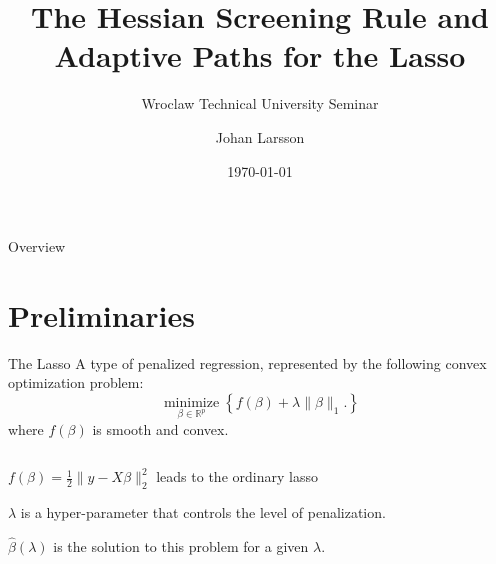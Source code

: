 



\title{The Hessian Screening Rule and Adaptive Paths for the Lasso}
\subtitle{Wroclaw Technical University Seminar}
\author{Johan Larsson}
\date{\today}




\begin{frame}{Overview}
  \tableofcontents[hideallsubsections]
\end{frame}

\section{Preliminaries}

\begin{frame}{The Lasso}
  A type of penalized regression, represented by the following
  convex optimization problem:
  \[
    \operatorname*{minimize}_{\beta \in \mathbb{R}^p}
    \left\{
      f(\beta) + \lambda \lVert \beta \rVert_1.
    \right\}
  \]
  where \(f(\beta)\) is smooth and convex. \medskip

  \begin{columns}[T]
    \begin{column}{0.45\linewidth}
      \(f(\beta) = \frac 1 2 \lVert y - X\beta\rVert_2^2\)
      leads to the ordinary lasso \medskip

      \(\lambda\) is a hyper-parameter that controls the level of
      \alert{penalization}. \medskip

      \(\hat\beta(\lambda)\) is the solution to this problem for a given
      \(\lambda.\)

    \end{column}
    \begin{column}{0.45\linewidth}
      \begin{figure}
        \centering
        \pgfplotsset{width=6cm,height=6cm}
        
      \end{figure}
    \end{column}
  \end{columns}
\end{frame}

